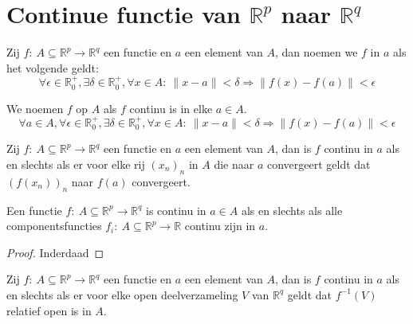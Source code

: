 \documentclass[main.tex]{subfiles}
\begin{document}
\section{Continue functie van $\mathbb{R}^{p}$ naar $\mathbb{R}^{q}$ }
\label{sec:continue-functie-van}

\begin{de}
  Zij $f:\ A \subseteq \mathbb{R}^{p} \rightarrow \mathbb{R}^{q}$ een functie en $a$ een element van $A$, dan noemen we $f$  in $a$ als het volgende geldt:
  \[ \forall \epsilon \in \mathbb{R}_{0}^{+}, \exists \delta \in \mathbb{R}_{0}^{+}, \forall x \in A:\ \|x-a\| < \delta \Rightarrow \|f(x)-f(a)\| < \epsilon \]
\end{de}

\begin{de}
  We noemen $f$  op $A$ als $f$ continu is in elke $a\in A$.
  \[ \forall a\in A, \forall \epsilon \in \mathbb{R}_{0}^{+}, \exists \delta \in \mathbb{R}_{0}^{+}, \forall x \in A:\ \|x-a\| < \delta \Rightarrow \|f(x)-f(a)\| < \epsilon \]
\end{de}

\begin{pr}
  \label{pr:in-rp-continu-asa-limiet-van-elke-rij}
  Zij $f:\ A \subseteq \mathbb{R}^{p} \rightarrow \mathbb{R}^{q}$ een functie en $a$ een element van $A$, dan is $f$ continu in $a$ als en slechts als er voor elke rij $(x_{n})_{n}$ in $A$ die naar $a$ convergeert geldt dat $(f(x_{n}))_{n}$ naar $f(a)$ convergeert.
\end{pr}

\begin{pr}
  Een functie $f:\ A \subseteq \mathbb{R}^{p} \rightarrow \mathbb{R}^{q}$ is continu in $a\in A$ als en slechts als alle componentsfuncties $f_{i}:\ A \subseteq \mathbb{R}^{p} \rightarrow \mathbb{R}$ continu zijn in $a$.

  \begin{proof}
    Inderdaad
  \end{proof}
\end{pr}

\begin{pr}
  Zij $f:\ A \subseteq \mathbb{R}^{p} \rightarrow \mathbb{R}^{q}$ een functie en $a$ een element van $A$, dan is $f$ continu in $a$ als en slechts als er voor elke open deelverzameling $V$ van $\mathbb{R}^{q}$ geldt dat $f^{-1}(V)$ relatief open is in $A$.
\end{pr}
\end{document}
